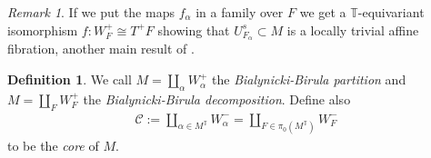 \documentclass[12pt]{article}
\numberwithin{equation}{section}
\theoremstyle{remark}
\newtheorem{remark}[theorem]{Remark}
\theoremstyle{definition}
\newtheorem{definition}[theorem]{Definition}
\numberwithin{theorem}{section}
\def\beq{\begin{eqnarray}}
\def\eeq{\end{eqnarray}}
\newcommand{\T}{{\mathbb{T}}}
\def\calC{{\mathcal C}}
\renewcommand{\1}{\mathbbm{1}}
\begin{document}
\begin{remark} \label{afffibr}
	If we put the maps $f_\alpha$ in a family over $F$ we get a $\T$-equivariant isomorphism $f:W^+_{F}\cong  T^+F$ showing that $U^s_{F_\alpha}\subset M$ is a locally trivial affine fibration, another main result of \cite{bialynicki-birula}.  
\end{remark}


\begin{definition}	We call $M=\coprod _{\alpha}W^+_\alpha$ the {\em Bialynicki-Birula partition} and $M=\coprod _{F}W^+_F$ the {\em Bialynicki-Birula decomposition}. Define also \beq\label{core}\calC:=\coprod_{\alpha\in M^\T} W^-_\alpha=\coprod_{F\in \pi_0(M^\T)} W^-_F\eeq to be the {\em core} of $M$. 
	
\end{definition}
\end{document}

